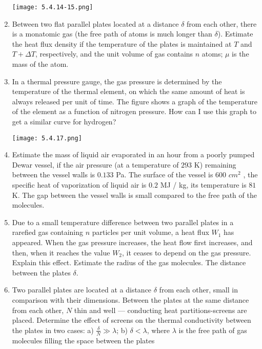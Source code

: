 \documentclass{article}
\begin{document}
\begin{enumerate}[label=5.4.\arabic*]
\begin{center}
    \texttt{[image: 5.4.14-15.png]}
\end{center}


\item Between two flat parallel plates located at a distance $\delta$ from each other, there is a monatomic gas (the free path of atoms is much longer than $\delta$). Estimate the heat flux density if the temperature of the plates is maintained at $T$ and $T + \Delta T$, respectively, and the unit volume of gas contains $n$ atoms; $\mu$ is the mass of the atom.

\item In a thermal pressure gauge, the gas pressure is determined by the temperature of the thermal element, on which the same amount of heat is always released per unit of time. The figure shows a graph of the temperature of the element as a function of nitrogen pressure. How can I use this graph to get a similar curve for hydrogen?

\begin{center}
    \texttt{[image: 5.4.17.png]}
\end{center}



\item Estimate the mass of liquid air evaporated in an hour from a poorly pumped Dewar vessel, if the air pressure (at a temperature of $293$ K) remaining between the vessel walls is $0.133$ Pa. The surface of the vessel is $600$ $cm^2$ , the specific heat of vaporization of liquid air is $0.2$ MJ / kg, its temperature is $81$ K. The gap between the vessel walls is small compared to the free path of the molecules.

\item Due to a small temperature difference between two parallel plates in a rarefied gas containing $n$ particles per unit volume, a heat flux $W_1$ has appeared. When the gas pressure increases, the heat flow first increases, and then, when it reaches the value $W_2$, it ceases to depend on the gas pressure. Explain this effect. Estimate the radius of the gas molecules. The distance between the plates $\delta$.

\item Two parallel plates are located at a distance $\delta$ from each other, small in comparison with their dimensions. Between the plates at the same distance from each other, $N$ thin and well — conducting heat partitions-screens are placed. Determine the effect of screens on the thermal conductivity between the plates in two cases: a) $\frac{\delta}{N} \gg \lambda$; b) $\delta < \lambda$, where $\lambda$ is the free path of gas molecules filling the space between the plates




\end{enumerate}
\end{document}
